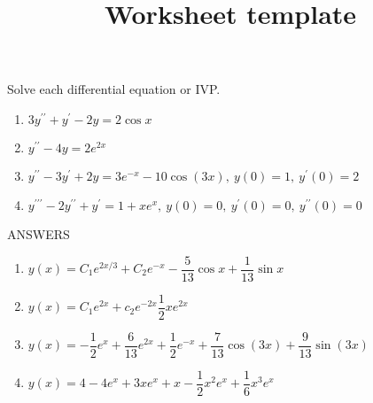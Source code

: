 \documentclass[12pt]{article}
\title{Worksheet template}
\begin{document}
\bigskip
\bigskip

Solve each differential equation or IVP.
\begin{enumerate}
	\item $3y^{\prime \prime} + y^{\prime} - 2y = 2 \cos x$
    
	\item $y^{\prime \prime} - 4y = 2 e^{2x}$
    
    \item $y^{\prime \prime} - 3y^{\prime} + 2y = 3e^{-x} - 10 \cos \left( 3x \right),
    	\> y(0) = 1, \> y^{\prime}(0) = 2$
        
	\item $y^{\prime \prime \prime} - 2y^{\prime \prime} + y^{\prime} = 1 + x e^{x},
    	\> y(0) = 0, \> y^{\prime}(0) = 0, \> y^{\prime \prime}(0) = 0$
        
\end{enumerate}

\bigskip

\newpage

ANSWERS

\begin{enumerate}
	\item $y(x) = C_1 e^{2x/3} + C_2 e^{-x} - \dfrac{5}{13} \cos x + \dfrac{1}{13} \sin x$
    \item $y(x) = C_1 e^{2x} + c_2 e^{-2x} \dfrac{1}{2} x e^{2x}$
    \item $y(x) = -\dfrac{1}{2} e^x + \dfrac{6}{13} e^{2x} + \dfrac{1}{2} e^{-x} 
    	+ \dfrac{7}{13} \cos \left( 3x \right) + \dfrac{9}{13} \sin \left( 3x \right)$
    \item $y(x) = 4 - 4 e^x + 3x e^x + x - \dfrac{1}{2} x^2 e^x + \dfrac{1}{6} x^3 e^x$
\end{enumerate}
\end{document}
